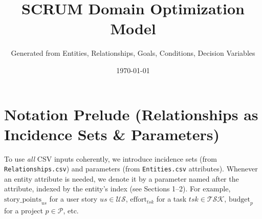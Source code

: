 \documentclass[11pt,a4paper]{article}
\title{SCRUM Domain Optimization Model}
\author{Generated from Entities, Relationships, Goals, Conditions, Decision Variables}
\date{\today}
\begin{document}
\maketitle
\tableofcontents
\newpage

\section*{Notation Prelude (Relationships as Incidence Sets \& Parameters)}
To use \emph{all} CSV inputs coherently, we introduce incidence sets (from \texttt{Relationships.csv}) and parameters (from \texttt{Entities.csv} attributes). Whenever an entity attribute is needed, we denote it by a parameter named after the attribute, indexed by the entity's index (see Sections 1--2). For example, \(\text{story\_points}_{us}\) for a user story \(us\in\mathcal{US}\), \(\text{effort}_{tsk}\) for a task \(tsk\in\mathcal{TSK}\), \(\text{budget}_{p}\) for a project \(p\in\mathcal{P}\), etc.
\end{document}
